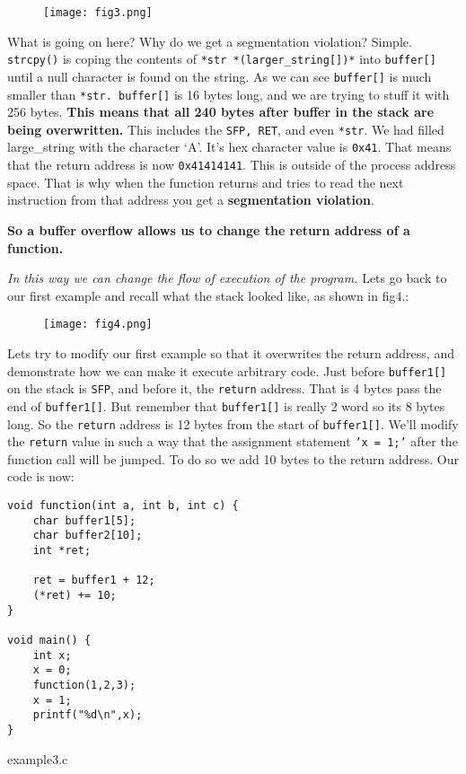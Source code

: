 \documentclass[a4paper]{article}
\begin{document}
\begin{figure}[H]
\centering
\texttt{[image: fig3.png]}
\end{figure}

What is going on here? Why do we get a segmentation violation? Simple. \texttt{strcpy()} is coping the contents of \texttt{*str *(larger\_string[])*} into \texttt{buffer[]} until a null character is found on the string. As we can see \texttt{buffer[]} is much smaller than \texttt{*str. buffer[]} is 16 bytes long, and we are trying to stuff it with 256 bytes. \textbf{This means that all 240 bytes after buffer in the stack are being overwritten.} This includes the \texttt{SFP, RET}, and even \texttt{*str}. We had filled large\_string with the character ‘A’. It’s hex character value is \texttt{0x41}. That means that the return address is now \texttt{0x41414141}. This is outside of the process address space. That is why when the function returns and tries to read the next instruction from that address you get a \textbf{segmentation violation}.

\textbf{So a buffer overflow allows us to change the return address of a function.}

\textit{In this way we can change the flow of execution of the program.} Lets go back to our first example and recall what the stack looked like, as shown in fig4.:

\begin{figure}[H]
\centering
\texttt{[image: fig4.png]}
\end{figure}

Lets try to modify our first example so that it overwrites the return address, and demonstrate how we can make it execute arbitrary code. Just before \texttt{buffer1[]} on the stack is \texttt{SFP}, and before it, the \texttt{return} address. That is 4 bytes pass the end of \texttt{buffer1[]}. But remember that \texttt{buffer1[]} is really 2 word so its 8 bytes long. So the \texttt{return} address is 12 bytes from the start of \texttt{buffer1[]}. We’ll modify the \texttt{return} value in such a way that the assignment statement \texttt{'x = 1;'} after the function call will be jumped. To do so we add 10 bytes to the return address. Our code is now:

\begin{listing}[H]
\begin{verbatim}
void function(int a, int b, int c) {
	char buffer1[5];
	char buffer2[10];
	int *ret;

	ret = buffer1 + 12;
	(*ret) += 10;
}

void main() {
	int x;
	x = 0;
	function(1,2,3);
	x = 1;
	printf("%d\n",x);
}
\end{verbatim}
\caption{example3.c}
\label{listing:1}
\end{listing}
\end{document}
